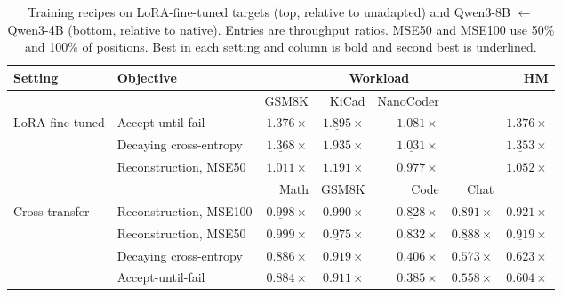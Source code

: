 \begin{table}[htbp]
\centering
\caption{Training recipes on LoRA-fine-tuned targets (top, relative to unadapted) and Qwen3-8B $\leftarrow$ Qwen3-4B (bottom, relative to native). Entries are throughput ratios. MSE50 and MSE100 use 50\% and 100\% of positions. Best in each setting and column is bold and second best is underlined.}
\label{tab:ablation-objective}
\small
\setlength{\tabcolsep}{4pt}
\begin{tabular}{llrrrrr}
\toprule
Setting & Objective & \multicolumn{4}{c}{Workload} & HM \\
\midrule
 & & GSM8K & KiCad & NanoCoder & & \\
\cmidrule(lr){3-5}
LoRA-fine-tuned & Accept-until-fail & $\mathbf{1.376}\times$ & $\underline{1.895}\times$ & $\mathbf{1.081}\times$ & & $\mathbf{1.376}\times$ \\
 & Decaying cross-entropy & $\underline{1.368}\times$ & $\mathbf{1.935}\times$ & $\underline{1.031}\times$ & & $\underline{1.353}\times$ \\
 & Reconstruction, MSE50 & $1.011\times$ & $1.191\times$ & $0.977\times$ & & $1.052\times$ \\
\midrule
 & & Math & GSM8K & Code & Chat & \\
\cmidrule(lr){3-6}
Cross-transfer & Reconstruction, MSE100 & $\underline{0.998}\times$ & $\mathbf{0.990}\times$ & $\underline{0.828}\times$ & $\mathbf{0.891}\times$ & $\mathbf{0.921}\times$ \\
 & Reconstruction, MSE50 & $\mathbf{0.999}\times$ & $\underline{0.975}\times$ & $\mathbf{0.832}\times$ & $\underline{0.888}\times$ & $\underline{0.919}\times$ \\
 & Decaying cross-entropy & $0.886\times$ & $0.919\times$ & $0.406\times$ & $0.573\times$ & $0.623\times$ \\
 & Accept-until-fail & $0.884\times$ & $0.911\times$ & $0.385\times$ & $0.558\times$ & $0.604\times$ \\
\bottomrule
\end{tabular}
\end{table}

